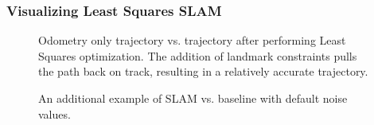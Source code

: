 \documentclass[12pt]{article}
\begin{document}
\subsubsection*{Visualizing Least Squares SLAM}
\begin{figure}[htb]
\label{fig:LSSLAM}
\caption{Odometry only trajectory vs. trajectory after performing Least Squares optimization.
The addition of landmark constraints pulls the path back on track, resulting in a relatively
accurate trajectory.}
\end{figure}

\begin{figure}[htb]
\label{fig:LSSLAM2}
\caption{An additional example of SLAM vs. baseline with default noise values.}
\end{figure}
\end{document}
